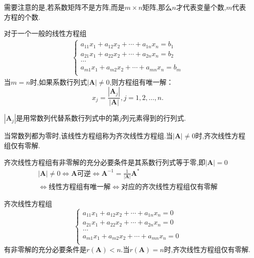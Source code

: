 需要注意的是,若系数矩阵不是方阵,而是$m\times n$矩阵,那么$n$才代表变量个数,$m$代表方程的个数.

\begin{theorem}
    对于一个一般的线性方程组
    \begin{gather*}
        \begin{cases}
            a_{11}x_1+a_{12}x_2+\dotsm+a_{1n}x_n= b_1 \\
            a_{21}x_1+a_{22}x_2+\dotsm+a_{2n}x_n= b_2 \\
            \dots \\
            a_{m1}x_1+a_{m2}x_2+\dotsm+a_{mn}x_n= b_m \\
        \end{cases}
    \end{gather*}
    当$m=n$时,如果系数行列式$\left\lvert \mathbf{A}\right\rvert \neq 0$,则方程组有唯一解：
    \begin{equation*}
        x_j=\frac{\left\lvert \mathbf{A}_j\right\rvert}{\left\lvert \mathbf{A}\right\rvert},j=1,2,\dots,n.
    \end{equation*}

    $\left\lvert \mathbf{A}_j\right\rvert$是用常数列代替系数行列式中的第$j$列元素得到的行列式.

    当常数列都为零时,该线性方程组称为齐次线性方程组.当$\left\lvert \mathbf{A}\right\rvert \neq 0$时,齐次线性方程组仅有零解.

    齐次线性方程组有非零解的充分必要条件是其系数行列式等于零,即$\left\lvert \mathbf{A}\right\rvert =0$
    \begin{gather*}
        \vert \mathbf{A} \vert \neq 0 \iff \text{$\mathbf{A}$可逆} \iff \mathbf{A}^{-1}=\frac{1}{\left\lvert \mathbf{A} \right\rvert}\mathbf{A}^*\\
        \iff \text{线性方程组有唯一解} \iff \text{对应的齐次线性方程组仅有零解}
    \end{gather*}
\end{theorem}

\begin{ttheorem}
    齐次线性方程组
    \begin{equation*}
        \begin{cases}
            a_{11}x_1+a_{12}x_2+\dotsm+a_{1n}x_n= 0 \\
            a_{21}x_1+a_{22}x_2+\dotsm+a_{2n}x_n= 0 \\
            \dots \\
            a_{m1}x_1+a_{m2}x_2+\dotsm+a_{mn}x_n= 0 \\
        \end{cases}
    \end{equation*}
    有非零解的充分必要条件是$r(\mathbf{A})<n$.当$r(\mathbf{A})=n$时,齐次线性方程组仅有零解.
\end{ttheorem}

